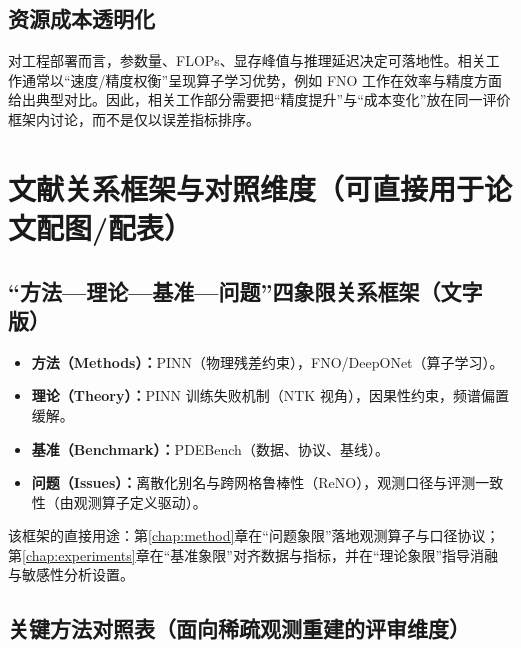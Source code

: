 \subsection{资源成本透明化}\label{subsec:rw_cost}

对工程部署而言，参数量、FLOPs、显存峰值与推理延迟决定可落地性。相关工作通常以“速度/精度权衡”呈现算子学习优势，例如 FNO 工作在效率与精度方面给出典型对比\cite{li2021fno}。因此，相关工作部分需要把“精度提升”与“成本变化”放在同一评价框架内讨论，而不是仅以误差指标排序。


\section{文献关系框架与对照维度（可直接用于论文配图/配表）}\label{sec:rw_framework}

\subsection{“方法—理论—基准—问题”四象限关系框架（文字版）}\label{subsec:rw_quadrant}

\begin{itemize}
  \item \textbf{方法（Methods）：}PINN（物理残差约束）\cite{raissi2019pinn}，FNO/DeepONet（算子学习）\cite{li2021fno,lu2021deeponet}。
  \item \textbf{理论（Theory）：}PINN 训练失败机制（NTK 视角）\cite{wang2022pinn_ntk}，因果性约束\cite{wang2022causality_pinn}，频谱偏置缓解\cite{liu2025diminishing_spectral_bias}。
  \item \textbf{基准（Benchmark）：}PDEBench（数据、协议、基线）\cite{takamoto2022pdebench}。
  \item \textbf{问题（Issues）：}离散化别名与跨网格鲁棒性（ReNO）\cite{bartolucci2023reno}，观测口径与评测一致性（由观测算子定义驱动）。
\end{itemize}

该框架的直接用途：第\ref{chap:method}章在“问题象限”落地观测算子与口径协议；第\ref{chap:experiments}章在“基准象限”对齐数据与指标，并在“理论象限”指导消融与敏感性分析设置。


\subsection{关键方法对照表（面向稀疏观测重建的评审维度）}\label{subsec:rw_table}

